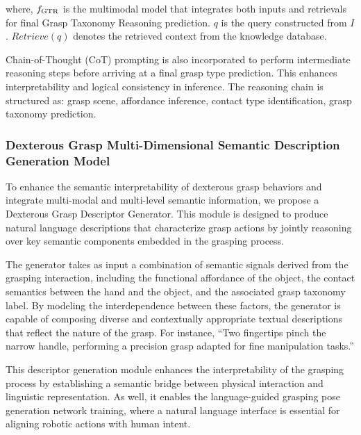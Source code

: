where, $f_{\rm GTR}$ is the multimodal model that integrates both inputs and retrievals for final Grasp Taxonomy Reasoning prediction. $q$ is the query constructed from $I$. 
$Retrieve(q)$ denotes the retrieved context from the knowledge database. 

Chain-of-Thought (CoT) prompting is also incorporated to perform intermediate reasoning steps before arriving at a final grasp type prediction. This enhances interpretability and logical consistency in inference. The reasoning chain is structured as: grasp scene, affordance inference, contact type identification, grasp taxonomy prediction.


\subsubsection{Dexterous Grasp Multi-Dimensional Semantic Description Generation Model}

To enhance the semantic interpretability of dexterous grasp behaviors and integrate multi-modal and multi-level semantic information, we propose a Dexterous Grasp Descriptor Generator. This module is designed to produce natural language descriptions that characterize grasp actions by jointly reasoning over key semantic components embedded in the grasping process.

The generator takes as input a combination of semantic signals derived from the grasping interaction, including the functional affordance of the object, the contact semantics between the hand and the object, and the associated grasp taxonomy label. By modeling the interdependence between these factors, the generator is capable of composing diverse and contextually appropriate textual descriptions that reflect the nature of the grasp. For instance, “Two fingertips pinch the narrow handle, performing a precision grasp adapted for fine manipulation tasks.”

This descriptor generation module enhances the interpretability of the grasping process by establishing a semantic bridge between physical interaction and linguistic representation. As well, it enables the language-guided grasping pose generation network training, where a natural language interface is essential for aligning robotic actions with human intent.


